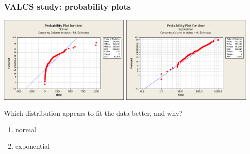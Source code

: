 
\begin{frame}
\frametitle{VALCS study: probability plots}
\includegraphics[width=0.49\textwidth]{Figures/norm_probplot_vet.jpg}
\includegraphics[width=0.49\textwidth]{Figures/exp_probplot_vet.jpg}
\vskip10pt
\begin{clicker}{Which distribution appears to fit the data better, and why?}
\begin{enumerate}
\item normal 
\item exponential %
\end{enumerate}
\end{clicker}
\end{frame}

